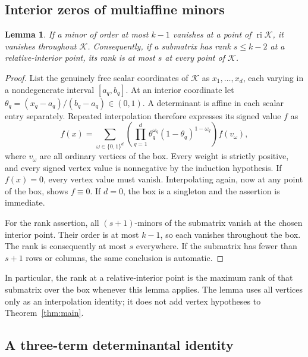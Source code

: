 \documentclass[11pt]{article}
\newtheorem{lemma}[theorem]{Lemma}
\theoremstyle{definition}
\theoremstyle{remark}
\numberwithin{equation}{section}
\newcommand{\K}{\mathcal K}
\DeclareMathOperator{\ri}{ri}
\begin{document}
\subsection{Interior zeros of multiaffine minors}

\begin{lemma}\label{lem:permanent}
If a minor of order at most $k-1$ vanishes at a point of $\ri\K$,
it vanishes throughout $\K$. Consequently, if a submatrix has rank
$s\leq k-2$ at a relative-interior point, its rank is at most $s$
at every point of $\K$.
\end{lemma}

\begin{proof}
List the genuinely free scalar coordinates of $\K$ as
$x_1,\ldots,x_d$, each varying in a nondegenerate interval
$[a_q,b_q]$. At an interior coordinate let
$\theta_q=(x_q-a_q)/(b_q-a_q)\in(0,1)$. A determinant is affine
in each scalar entry separately. Repeated interpolation therefore
expresses its signed value $f$ as
\begin{equation}\label{eq:interpolate}
 f(x)=\sum_{\omega\in\{0,1\}^d}
 \left(\prod_{q=1}^d\theta_q^{\omega_q}
            (1-\theta_q)^{1-\omega_q}\right) f(v_\omega),
\end{equation}
where $v_\omega$ are all ordinary vertices of the box. Every
weight is strictly positive, and every signed vertex value is
nonnegative by the induction hypothesis. If $f(x)=0$, every
vertex value must vanish. Interpolating again, now at any point of
the box, shows $f\equiv0$. If $d=0$, the box is a singleton and
the assertion is immediate.

For the rank assertion, all $(s+1)$-minors of the submatrix vanish
at the chosen interior point. Their order is at most $k-1$, so
each vanishes throughout the box. The rank is consequently at
most $s$ everywhere. If the submatrix has fewer than $s+1$ rows
or columns, the same conclusion is automatic.
\end{proof}

In particular, the rank at a relative-interior point is the maximum
rank of that submatrix over the box whenever this lemma applies.
The lemma uses all vertices only as an interpolation identity; it
does not add vertex hypotheses to Theorem~\ref{thm:main}.

\subsection{A three-term determinantal identity}
\end{document}

